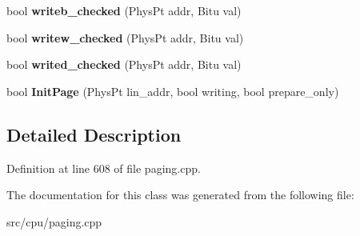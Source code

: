 \begin{DoxyCompactItemize}
\item 
\hypertarget{classNewInitPageHandler_a342ecdf4f9a89943a737464c4f86012e}{bool {\bfseries writeb\-\_\-checked} (Phys\-Pt addr, Bitu val)}\label{classNewInitPageHandler_a342ecdf4f9a89943a737464c4f86012e}

\item 
\hypertarget{classNewInitPageHandler_a03301e03d6dc87b05c36b29685b30d92}{bool {\bfseries writew\-\_\-checked} (Phys\-Pt addr, Bitu val)}\label{classNewInitPageHandler_a03301e03d6dc87b05c36b29685b30d92}

\item 
\hypertarget{classNewInitPageHandler_a192d6438cfe0114d22a2fb7f3329600a}{bool {\bfseries writed\-\_\-checked} (Phys\-Pt addr, Bitu val)}\label{classNewInitPageHandler_a192d6438cfe0114d22a2fb7f3329600a}

\item 
\hypertarget{classNewInitPageHandler_a1ed4fb6bc908d2a5b4a8c0b486be0852}{bool {\bfseries Init\-Page} (Phys\-Pt lin\-\_\-addr, bool writing, bool prepare\-\_\-only)}\label{classNewInitPageHandler_a1ed4fb6bc908d2a5b4a8c0b486be0852}

\end{DoxyCompactItemize}


\subsection{Detailed Description}


Definition at line 608 of file paging.\-cpp.



The documentation for this class was generated from the following file\-:\begin{DoxyCompactItemize}
\item 
src/cpu/paging.\-cpp\end{DoxyCompactItemize}
